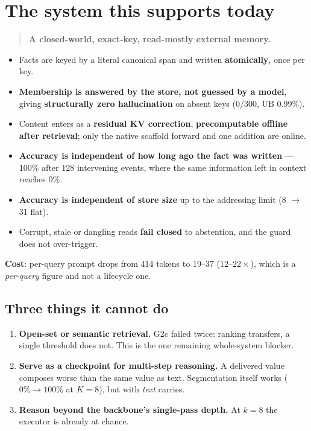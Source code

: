 \documentclass[11pt, a4paper]{article}
\begin{document}
\section{The system this supports today}

\begin{quote}
\textbf{A closed-world, exact-key, read-mostly external memory.}
\end{quote}

\begin{itemize}
\item Facts are keyed by a literal canonical span and written \textbf{atomically}, once
per key.
\item \textbf{Membership is answered by the store, not guessed by a model}, giving
\textbf{structurally zero hallucination} on absent keys (0/300, UB 0.99\%).
\item Content enters as a \textbf{residual KV correction}, \textbf{precomputable offline
after retrieval}; only the native scaffold forward and one addition are online.
\item \textbf{Accuracy is independent of how long ago the fact was written} --- 100\%
after 128 intervening events, where the same information left in context reaches 0\%.
\item \textbf{Accuracy is independent of store size} up to the addressing limit (8 $\to$ 31
flat).
\item Corrupt, stale or dangling reads \textbf{fail closed} to abstention, and the guard
does not over-trigger.
\end{itemize}

\textbf{Cost}: per-query prompt drops from 414 tokens to 19--37 ($12$--$22\times$), which
is a \emph{per-query} figure and not a lifecycle one.

\subsection{Three things it cannot do}

\begin{enumerate}
\item \textbf{Open-set or semantic retrieval.} G2c failed twice: ranking transfers, a
single threshold does not. This is the one remaining whole-system blocker.
\item \textbf{Serve as a checkpoint for multi-step reasoning.} A delivered value composes
worse than the same value as text. Segmentation itself works ($0\% \to 100\%$ at $K{=}8$),
but with \emph{text} carries.
\item \textbf{Reason beyond the backbone's single-pass depth.} At $k{=}8$ the executor is
already at chance.
\end{enumerate}
\end{document}
